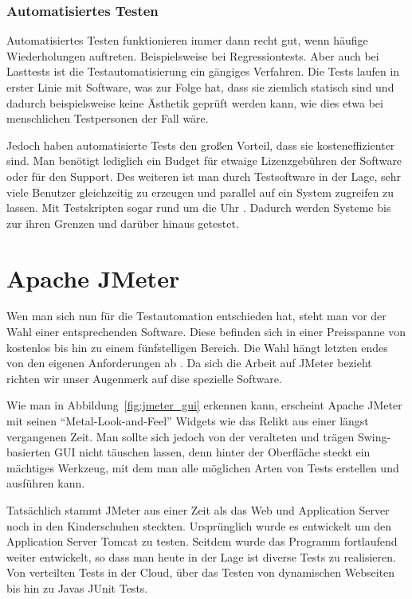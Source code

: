 \documentclass[a4paper,12pt]{article}
\begin{document}
\subsubsection{Automatisiertes Testen}
Automatisiertes Testen funktionieren immer dann recht gut, wenn häufige Wiederholungen auftreten. Beispielsweise bei Regressiontests. Aber auch bei Lasttests ist die Testautomatisierung ein gängiges Verfahren. Die Tests laufen in erster Linie mit Software, was zur Folge hat, dass sie ziemlich statisch sind und dadurch beispielsweise keine Ästhetik geprüft werden kann, wie dies etwa bei menschlichen Testpersonen der Fall wäre.

Jedoch haben automatisierte Tests den großen Vorteil, dass sie kosteneffizienter sind. Man benötigt lediglich ein Budget für etwaige Lizenzgebühren der Software oder für den Support. Des weiteren ist man durch Testsoftware in der Lage, sehr viele Benutzer gleichzeitig zu erzeugen und parallel auf ein System zugreifen zu lassen. Mit Testskripten sogar rund um die Uhr \cite{online:Testautomatisierung}. Dadurch werden Systeme bis zur ihren Grenzen und darüber hinaus getestet.

\section{Apache JMeter}
Wen man sich nun für die Testautomation entschieden hat, steht man vor der Wahl einer entsprechenden Software. Diese befinden sich in einer Preisspanne von kostenlos bis hin zu einem fünfstelligen Bereich. Die Wahl hängt letzten endes von den eigenen Anforderungen ab \cite[S. 15]{book:ApacheJMeter}. Da sich die Arbeit auf JMeter bezieht richten wir unser Augenmerk auf dise spezielle Software.

Wie man in Abbildung~\ref{fig:jmeter_gui} erkennen kann, erscheint Apache JMeter mit seinen "`Metal-Look-and-Feel"' \cite{online:wikiSwing} Widgets wie das Relikt aus einer längst vergangenen Zeit. Man sollte sich jedoch von der veralteten und trägen Swing-basierten GUI nicht täuschen lassen, denn hinter der Oberfläche steckt ein mächtiges Werkzeug, mit dem man alle möglichen Arten von Tests erstellen und ausführen kann. \cite{online:heiseJMeterOderGatling}

Tatsächlich stammt JMeter aus einer Zeit als das Web und Application Server noch in den Kinderschuhen steckten. Ursprünglich wurde es entwickelt um den Application Server Tomcat zu testen. Seitdem wurde das Programm fortlaufend weiter entwickelt, so dass man heute in der Lage ist diverse Tests zu realisieren. Von verteilten Tests in der Cloud, über das Testen von dynamischen Webseiten bis hin zu Javas JUnit Tests. \cite{online:ApacheJMeter}
\end{document}

